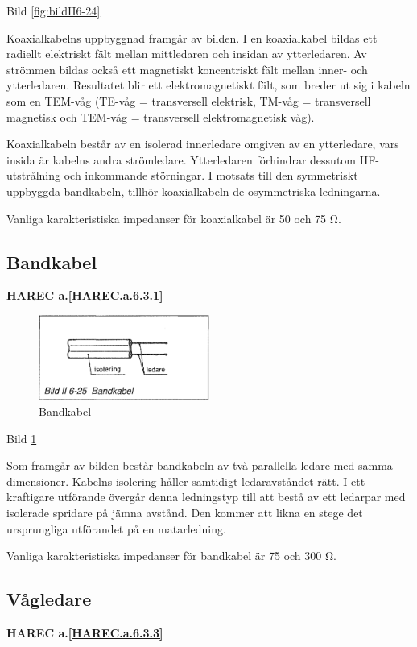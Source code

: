 Bild \ref{fig:bildII6-24}

Koaxialkabelns uppbyggnad framgår av bilden. I en koaxialkabel bildas
ett radiellt elektriskt fält mellan mittledaren och insidan av
ytterledaren. Av strömmen bildas också ett magnetiskt koncentriskt
fält mellan inner- och ytterledaren. Resultatet blir ett
elektromagnetiskt fält, som breder ut sig i kabeln som en TEM-våg
(TE-våg = transversell elektrisk, TM-våg = transversell magnetisk och
TEM-våg = transversell elektromagnetisk våg).

Koaxialkabeln består av en isolerad innerledare omgiven av en
ytterledare, vars insida är kabelns andra strömledare. Ytterledaren
förhindrar dessutom HF-utstrålning och inkommande störningar. I
motsats till den symmetriskt uppbyggda bandkabeln, tillhör
koaxialkabeln de osymmetriska ledningarna.

Vanliga karakteristiska impedanser för koaxialkabel är 50 och 75 Ω.

\subsection{Bandkabel}
\textbf{
HAREC a.\ref{HAREC.a.6.3.1}\label{myHAREC.a.6.3.1}
}

\begin{figure}
  \includegraphics[width=0.5\textwidth]{images/bild_2_6-25}
  \caption{Bandkabel}
  \label{fig:bildII6-25}
\end{figure}

Bild \ref{fig:bildII6-25}

Som framgår av bilden består bandkabeln av två parallella ledare med
samma dimensioner. Kabelns isolering håller samtidigt ledaravståndet
rätt. I ett kraftigare utförande övergår denna ledningstyp till att
bestå av ett ledarpar med isolerade spridare på jämna avstånd. Den
kommer att likna en stege det ursprungliga utförandet på en
matarledning.

Vanliga karakteristiska impedanser för bandkabel är 75 och 300 Ω.

\subsection{Vågledare}
\textbf{
HAREC a.\ref{HAREC.a.6.3.3}\label{myHAREC.a.6.3.3}
}

